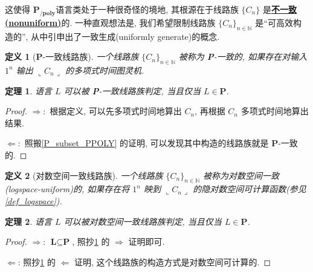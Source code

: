 \documentclass[8pt]{article}
\theoremstyle{compact}
\newtheorem{theorem}{定理}[section]
\newtheorem{definition}{定义}[section]
\def\obj#1{\textbf{\uline{#1}}}
\def\rep#1{\llcorner{#1}\lrcorner}
\def\P{\textbf{P}}
\def\L{\textbf{L}}
\def\PPOLY{$\textbf{P}_{\textbf{/poly}}$}
\begin{document}
这使得 \PPOLY 语言类处于一种很奇怪的境地, 其根源在于线路族 $\{C_n\}$ 是\obj{不一致(nonuniform)}的. 一种直观想法是, 我们希望限制线路族 $\{C_n\}_{n \in \mathbb N}$ 是“可高效构造的”, 从中引申出了一致生成(uniformly generate)的概念.

\begin{definition}[\P-一致线路族]
	一个线路族 $\{C_n\}_{n \in \mathbb N}$ 被称为 \P-一致的, 如果存在对输入 $1^n$ 输出 $\rep{C_n}$ 的多项式时间图灵机.
\end{definition}
\begin{theorem}
	语言 $L$ 可以被 \P-一致线路族判定, 当且仅当 $L \in \P$.
	\label{P-uniform}
\end{theorem}
\begin{proof}
	$\Rightarrow: $ 根据定义, 可以先多项式时间地算出 $C_n$, 再根据 $C_n$ 多项式时间地算出结果.
	
	$\Leftarrow: $ 照搬\cref{P_subset_PPOLY} 的证明, 可以发现其中构造的线路族就是 \P-一致的.
\end{proof}
\begin{definition}[对数空间一致线路族]
	一个线路族 $\{C_n\}_{n \in \mathbb N}$ 被称为对数空间一致(logspace-uniform)的, 如果存在将 $1^n$ 映到 $\rep{C_n}$ 的隐对数空间可计算函数(参见\cref{def_logspace}).
\end{definition}
\begin{theorem}
	语言 $L$ 可以被对数空间一致线路族判定, 当且仅当 $L \in \P$.
\end{theorem}
\begin{proof}
	$\Rightarrow$: $\L \subseteq \P$, 照抄\cref{P-uniform} 的 $\Rightarrow$ 证明即可.

	$\Leftarrow$: 照抄\cref{P-uniform} 的 $\Leftarrow$ 证明, 这个线路族的构造方式是对数空间可计算的.
\end{proof}
\end{document}
